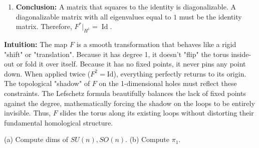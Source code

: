 \begin{solution}
\begin{enumerate}
    \item \textbf{Conclusion:}
    A matrix that squares to the identity is diagonalizable. A diagonalizable matrix with all eigenvalues equal to $1$ must be the identity matrix. Therefore, $F^* |_{H^1} = \operatorname{Id}$.
\end{enumerate}

\medskip
\textbf{Intuition:}
The map $F$ is a smooth transformation that behaves like a rigid "shift" or "translation". Because it has degree 1, it doesn't "flip" the torus inside-out or fold it over itself. Because it has no fixed points, it never pins any point down. When applied twice ($F^2 = \text{Id}$), everything perfectly returns to its origin. 
The topological "shadow" of $F$ on the 1-dimensional holes must reflect these constraints. The Lefschetz formula beautifully balances the lack of fixed points against the degree, mathematically forcing the shadow on the loops to be entirely invisible. Thus, $F$ slides the torus along its existing loops without distorting their fundamental homological structure.
\end{solution}

\begin{exercise}
\label{geometry:2019:9}
(a) Compute dims of $SU(n), SO(n)$. (b) Compute $\pi_1$.
\end{exercise}

